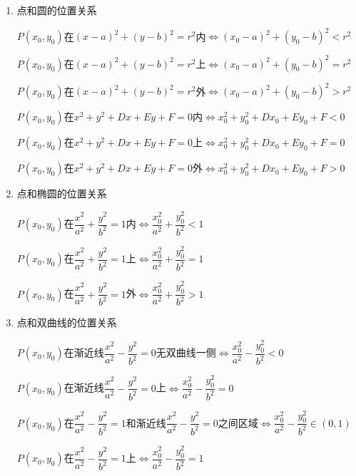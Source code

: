 \begin{enumerate}
    \item 点和圆的位置关系
    \begin{jieda}
        $P(x_0, y_0)$在$(x-a)^2+(y-b)^2 = r^2$内$\Longleftrightarrow (x_0-a)^2+(y_0-b)^2 < r^2$
        
        $P(x_0, y_0)$在$(x-a)^2+(y-b)^2 = r^2$上$\Longleftrightarrow (x_0-a)^2+(y_0-b)^2 = r^2$
        
        $P(x_0, y_0)$在$(x-a)^2+(y-b)^2 = r^2$外$\Longleftrightarrow (x_0-a)^2+(y_0-b)^2 > r^2$
        
        $P(x_0, y_0)$在$x^2+y^2+Dx+Ey+F = 0$内$\Longleftrightarrow x_0^2+y_0^2+Dx_0+Ey_0+F < 0$
        
        $P(x_0, y_0)$在$x^2+y^2+Dx+Ey+F = 0$上$\Longleftrightarrow x_0^2+y_0^2+Dx_0+Ey_0+F = 0$
        
        $P(x_0, y_0)$在$x^2+y^2+Dx+Ey+F = 0$外$\Longleftrightarrow x_0^2+y_0^2+Dx_0+Ey_0+F > 0$
    \end{jieda}

    \item 点和椭圆的位置关系
    \begin{jieda}
        $P(x_0, y_0)$在$\dfrac{x^2}{a^2} + \dfrac{y^2}{b^2} = 1$内$\Longleftrightarrow \dfrac{x_0^2}{a^2} + \dfrac{y_0^2}{b^2} < 1$
        
        $P(x_0, y_0)$在$\dfrac{x^2}{a^2} + \dfrac{y^2}{b^2} = 1$上$\Longleftrightarrow \dfrac{x_0^2}{a^2} + \dfrac{y_0^2}{b^2} = 1$
        
        $P(x_0, y_0)$在$\dfrac{x^2}{a^2} + \dfrac{y^2}{b^2} = 1$外$\Longleftrightarrow \dfrac{x_0^2}{a^2} + \dfrac{y_0^2}{b^2} > 1$
    \end{jieda}

    \item 点和双曲线的位置关系
    \begin{jieda}
        $P(x_0, y_0)$在渐近线$\dfrac{x^2}{a^2} - \dfrac{y^2}{b^2} = 0$无双曲线一侧$\Longleftrightarrow \dfrac{x_0^2}{a^2} - \dfrac{y_0^2}{b^2} < 0$
        
        $P(x_0, y_0)$在渐近线$\dfrac{x^2}{a^2} - \dfrac{y^2}{b^2} = 0$上$\Longleftrightarrow \dfrac{x_0^2}{a^2} - \dfrac{y_0^2}{b^2} = 0$
        
        $P(x_0, y_0)$在$\dfrac{x^2}{a^2} - \dfrac{y^2}{b^2} = 1$和渐近线$\dfrac{x^2}{a^2} - \dfrac{y^2}{b^2} = 0$之间区域$\Longleftrightarrow \dfrac{x_0^2}{a^2} - \dfrac{y_0^2}{b^2} \in (0, 1)$
        
        $P(x_0, y_0)$在$\dfrac{x^2}{a^2} - \dfrac{y^2}{b^2} = 1$上$\Longleftrightarrow \dfrac{x_0^2}{a^2} - \dfrac{y_0^2}{b^2} = 1$
        

\end{jieda}
\end{enumerate}
